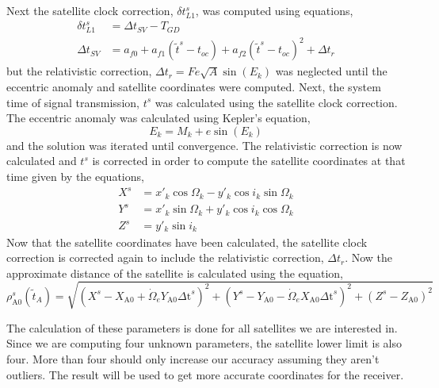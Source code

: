 Next the satellite clock correction, $\delta t_{L1}^s$, was computed using equations, 
\begin{align*}
	\delta t_{L1}^s &= \Delta t_{SV}-T_{GD} \\
	\Delta t_{SV} &= a_{f0} + a_{f1}(\tilde{t}^s - t_{oc}) + a_{f2}(\tilde{t}^s - t_{oc})^2 + \Delta t_r 
\end{align*}
but the relativistic correction, $\Delta t_r = Fe\sqrt{A} \sin(E_k)$ was neglected until the eccentric anomaly and satellite coordinates were computed. Next, the system time of signal transmission, $t^s$ was calculated using the satellite clock correction. The eccentric anomaly was calculated using Kepler's equation, 
\begin{equation*}
	E_k = M_k + e \sin(E_k) 
\end{equation*}
and the solution was iterated until convergence. The relativistic correction is now calculated and $t^s$ is corrected in order to compute the satellite coordinates at that time given by the equations, 
\begin{align}
	X^s &=x'_k \cos \Omega_k -y'_k \cos i_k \sin \Omega_k \nonumber \\
	Y^s &=x'_k \sin \Omega_k +y'_k \cos i_k \cos \Omega_k \nonumber \\
	Z^s &= y'_k \sin i_k \nonumber 
\end{align}
Now that the satellite coordinates have been calculated, the satellite clock correction is corrected again to include the relativistic correction, $\Delta t_r$. Now the approximate distance of the satellite is calculated using the equation, 
\begin{equation*}
	\rho _{\text{A0}}^s\left(\tilde{t}_A\right) = \sqrt{\left( X^s-X_{\text{A0}}+\dot{\Omega}_eY_{\text{A0}} \text{$\Delta $t}^s \right)^2+\left( Y^s-Y_{\text{A0}}-\dot{\Omega}_eX_{\text{A0}} \text{$\Delta $t}^s \right)^2+\left( Z^s-Z_{\text{A0}} \right)^2} 
\end{equation*}

The calculation of these parameters is done for all satellites we are interested in. Since we are computing four unknown parameters, the satellite lower limit is also four. More than four should only increase our accuracy assuming they aren't outliers. The result will be used to get more accurate coordinates for the receiver. 


